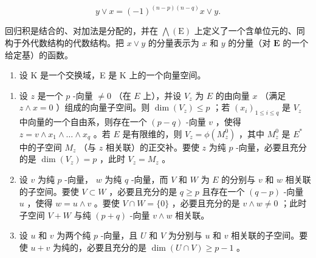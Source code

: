 \[
y \vee x = (- 1) ^ {(n - p) (n - q)} x \vee y.
\]

回归积是结合的、对加法是分配的，并在 \(\bigwedge(\mathrm{E})\) 上定义了一个含单位元的、同构于外代数结构的代数结构。把 \(x \vee y\) 的分量表示为 \(x\) 和 \(y\) 的分量（对 \(\mathbf{E}\) 的一个给定基）的函数。

\begin{enumerate}
\def\labelenumi{\arabic{enumi}.}
\setcounter{enumi}{16}
\tightlist
\item
  设 K 是一个交换域，E 是 K 上的一个向量空间。
\end{enumerate}

\begin{enumerate}
\def\labelenumi{(\alph{enumi})}
\item
  设 \(z\) 是一个 \(p\) -向量 \(\neq 0\) （在 \(E\) 上），并设 \(V_{z}\) 为 \(E\) 的由向量 \(x\) （满足 \(z \wedge x = 0\) ）组成的向量子空间。则 \(\dim(V_{z}) \leqslant p\) ；若 \((x_{i})_{1 \leqslant i \leqslant q}\) 是 \(V_{z}\) 中向量的一个自由系，则存在一个 \((p - q)\) -向量 \(v\) ，使得 \(z = v \wedge x_{1} \wedge \dots \wedge x_{q}\) 。若 \(E\) 是有限维的，则 \(V_{z} = \phi(M_{z}^{0})\) ，其中 \(M_{z}^{0}\) 是 \(E^{*}\) 中的子空间 \(M_{z}\) （与 \(z\) 相关联）的正交补。要使 \(z\) 为纯 \(p\) -向量，必要且充分的是 \(\dim(V_{z}) = p\) ，此时 \(V_{z} = M_{z}\) 。
\item
  设 \(v\) 为纯 \(p\) -向量， \(w\) 为纯 \(q\) -向量，而 \(V\) 和 \(W\) 为 \(E\) 的分别与 \(v\) 和 \(w\) 相关联的子空间。要使 \(V \subset W\) ，必要且充分的是 \(q \geqslant p\) 且存在一个 \((q - p)\) -向量 \(u\) ，使得 \(w = u \wedge v\) 。要使 \(V \cap W = \{0\}\) ，必要且充分的是 \(v \wedge w \neq 0\) ；此时子空间 \(V + W\) 与纯 \((p + q)\) -向量 \(v \wedge w\) 相关联。
\item
  设 \(u\) 和 \(v\) 为两个纯 \(p\) -向量，且 \(U\) 和 \(V\) 为分别与 \(u\) 和 \(v\) 相关联的子空间。要使 \(u + v\) 为纯的，必要且充分的是 \(\dim(U \cap V) \geqslant p - 1\) 。
\end{enumerate}


